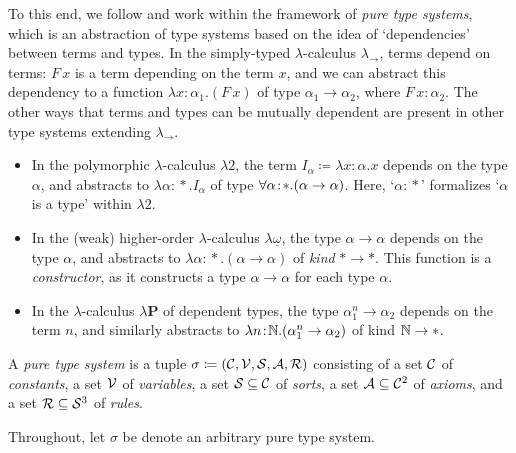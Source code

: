 \documentclass[reqno, twoside]{article}
\begin{document}
    To this end, we follow \cite{Bar91} and work within the framework of \textit{pure type systems}, which is an abstraction of type systems based on the idea of `dependencies' between terms and types. In the simply-typed $\lambda$-calculus $\lambda_\rightarrow$, terms depend on terms: $F\,x$ is a term depending on the term $x$, and we can abstract this dependency to a function $\lambda x\!:\!\alpha_1.(F\,x)$ of type $\alpha_1\rightarrow\alpha_2$, where $F\,x\!:\!\alpha_2$. The other ways that terms and types can be mutually dependent are present in other type systems extending $\lambda_\rightarrow$.
    \begin{itemize}\small
        \item In the polymorphic $\lambda$-calculus $\lambda2$, the term $I_\alpha\coloneqq\lambda x\!:\!\alpha.x$ depends on the type $\alpha$, and abstracts to $\lambda\alpha\!:\!\ast.I_\alpha$ of type $\forall\alpha\!:\!\ast.(\alpha\rightarrow\alpha)$. Here, `$\alpha\!:\!\ast$' formalizes `$\alpha$ is a type' within $\lambda2$.
            \vspace{-0.05in}
        \item In the (weak) higher-order $\lambda$-calculus $\lambda\underline{\omega}$, the type $\alpha\rightarrow\alpha$ depends on the type $\alpha$, and abstracts to $\lambda\alpha\!:\!\ast.(\alpha\rightarrow\alpha)$ of \textit{kind} $\ast\to\ast$. This function is a \textit{constructor}, as it constructs a type $\alpha\rightarrow\alpha$ for each type $\alpha$.
            \vspace{-0.05in}
        \item In the $\lambda$-calculus $\lambda\mathbf{P}$ of dependent types, the type $\alpha_1^n\to\alpha_2$ depends on the term $n$, and similarly abstracts to $\lambda n\!:\!\mathbb{N}.(\alpha_1^n\to\alpha_2)$ of kind $\mathbb{N}\to\ast$. \TODO
    \end{itemize}

    \begin{definition}
        A \textit{pure type system} is a tuple $\sigma\coloneqq(\mathcal{C},\mathcal{V},\mathcal{S},\mathcal{A},\mathcal{R})$ consisting of a set $\mathcal{C}$ of \textit{constants}, a set $\mathcal{V}$ of \textit{variables}, a set $\mathcal{S}\subseteq\mathcal{C}$ of \textit{sorts}, a set $\mathcal{A}\subseteq\mathcal{C}^2$ of \textit{axioms}, and a set $\mathcal{R}\subseteq\mathcal{S}^3$ of \textit{rules}.
    \end{definition}

    \begin{notation}
        Throughout, let $\sigma$ be denote an arbitrary pure type system.
    \end{notation}
\end{document}
